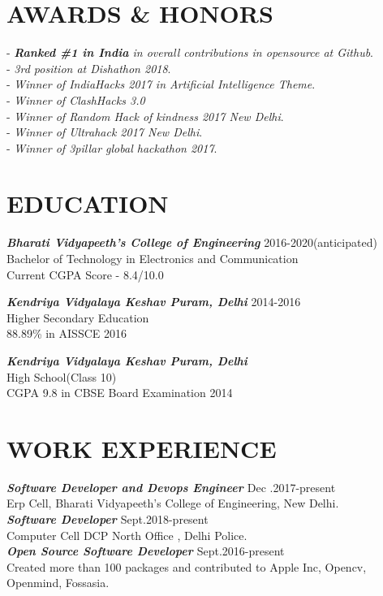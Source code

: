 \documentclass[margin, 10pt]{res}
\begin{document}
\begin{resume}
    
    
    \section{AWARDS \& HONORS}
    - {\sl {\bf Ranked \#1 in India} in overall contributions in opensource at Github}.\\
    - {\sl 3rd position at Dishathon 2018}.\\
    - {\sl Winner of IndiaHacks 2017 in Artificial Intelligence Theme}.\\
    - {\sl Winner of ClashHacks 3.0 }\\
    - {\sl Winner of Random Hack of kindness 2017 New Delhi}.\\
    - {\sl Winner of Ultrahack 2017 New Delhi}.\\
    - {\sl Winner of 3pillar global hackathon 2017}.\\    
    \section{EDUCATION} 
    {\sl \bf{Bharati Vidyapeeth's College of Engineering}} \hfill 2016-2020(anticipated)\\ Bachelor of Technology in Electronics and Communication\\
    Current CGPA Score - 8.4/10.0
    
    {\sl \bf{Kendriya Vidyalaya Keshav Puram, Delhi}}
    \hfill 2014-2016 \\Higher Secondary Education\\ 88.89\% in AISSCE 2016
    
    {\sl \bf{Kendriya Vidyalaya Keshav Puram, Delhi}}\\High School(Class 10)\\CGPA 9.8 in CBSE Board Examination 2014
    
    \section{WORK EXPERIENCE}
    {\sl {\bf Software Developer and Devops Engineer }}\hfill Dec .2017-present \\
    Erp Cell, Bharati Vidyapeeth's College of Engineering, New Delhi.\\
    {\sl {\bf Software Developer }}\hfill Sept.2018-present \\
    Computer Cell DCP North Office , Delhi Police.\\
    {\sl {\bf Open Source Software Developer }}\hfill Sept.2016-present \\
    Created more than 100 packages and contributed to Apple Inc, Opencv, Openmind, Fossasia.\\
  

\end{resume}
\end{document}
